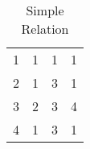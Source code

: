 \documentclass{article}
\begin{document}
 
\begin{table}[h!]
\caption{Simple Relation}
\begin{center}

\begin{tabular}{|c|c|c|c|}
   \hline
  \cellcolor{excel}{$A_1$}  & \cellcolor{excel}{$A_2$}  &   \cellcolor{excel}{$A_3$}
&  \cellcolor{excel}{$A_4$}  \\
  \hline
  1 & 1 & 1  &   1 \\
      \hline
  2 & 1 & 3  &   1 \\
      \hline
  3 & 2 & 3  &   4 \\
      \hline
  4 & 1 & 3  &   1 \\
      \hline
   
\end{tabular}
\end{center}
\label{tab:flatfile}
\end{table}%






 
\end{document}
